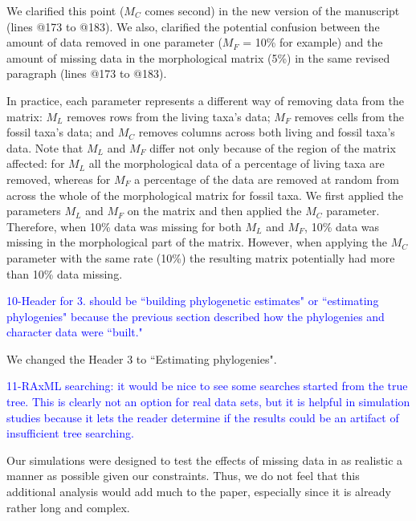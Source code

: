 \documentclass[11pt]{letter}
\begin{document}
\begin{letter}{}
We clarified this point ($M_C$ comes second) in the new version of the manuscript (lines @173 to @183). We also, clarified the potential confusion between the amount of data removed in one parameter ($M_F$ = 10\% for example) and the amount of missing data in the morphological matrix (5\%) in the same revised paragraph (lines @173 to @183).

\hfill\begin{minipage}{\dimexpr\textwidth-1cm}
In practice, each parameter represents a different way of removing data from the matrix: $M_L$ removes rows from the living taxa's data; $M_F$ removes cells from the fossil taxa's data; and $M_C$ removes columns across both living and fossil taxa's data. Note that $M_L$ and $M_F$ differ not only because of the region of the matrix affected: for $M_L$ all the morphological data of a percentage of living taxa are removed, whereas for $M_F$ a percentage of the data are removed at random from across the whole of the morphological matrix for fossil taxa. We first applied the parameters $M_L$ and $M_F$ on the matrix and then applied the $M_C$ parameter. Therefore, when 10\% data was missing for both $M_L$ and $M_F$, 10\% data was missing in the morphological part of the matrix. However, when applying the $M_C$ parameter with the same rate (10\%) the resulting matrix potentially had more than 10\% data missing.
\end{minipage}


\textcolor{blue}{10-Header for 3. should be ``building phylogenetic estimates" or ``estimating phylogenies" because the previous section described how the phylogenies and character data were ``built."}

We changed the Header 3 to ``Estimating phylogenies".


\textcolor{blue}{11-RAxML searching: it would be nice to see some searches started from the true tree. This is clearly not an option for real data sets, but it is helpful in simulation studies because it lets the reader determine if the results could be an artifact of insufficient tree searching.}

Our simulations were designed to test the effects of missing data in as realistic a manner as possible given our constraints. Thus, we do not feel that this additional analysis would add much to the paper, especially since it is already rather long and complex. 



\end{letter}
\end{document}
